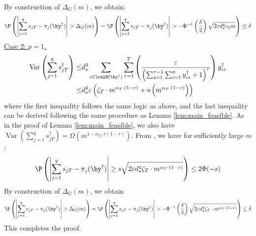 \documentclass[blindrev]{informs3noheader}
\DeclareMathOperator{\Var}{Var}
\begin{document}
By construction of $\Delta_G(m)$, we obtain:
\[\P\left(\left|\sum_{j=1}^q s_{jT} - \pi_{j}(\by^\dagger)\right|>\Delta_G(m)\right)=\P\left(\left|\sum_{j=1}^q s_{jT} - \pi_{j}(\by^\dagger)\right|> -\Phi^{-1}\left(\frac{\delta}{2}\right)\sqrt{2\varepsilon d_\star^4 c_0 m}\right)\leq\delta \]
\underline{Case 2: $p=1$.}
\begin{align*}
\Var\left(\sum_{j=1}^q s^\dagger_{jT}\right)
\leq & d_\star^3\sum_{i \in \calN(\by^\dagger)} \sum_{\tau=1}^T \left(\frac{\varepsilon}{\left(\sum_{s=1}^{\tau-1} \sum_{i=1}^n y^\dagger_{is} + 1\right)^r}\right)y^\dagger_{i\tau}
\\\leq & d_\star^4 \varepsilon\left(\zeta_T \cdot m^{\alpha_T \cdot (1-r)} + o\left(m^{\alpha_T \cdot (1-r)} \right)\right)
\end{align*}
where the first inequality follows the same logic as above, and the last inequality can be derived following the same procedure as Lemma \ref{lem:main_feasible}. As in the proof of Lemma \ref{lem:main_feasible}, we also have $\Var\left(\sum_{j=1}^q s^\dagger_{jT}\right)=\Omega(m^{1-\alpha_T\cdot r(1-r)})$. From \cite{janisch2024berry}, we have for sufficiently large $m$:
\[\P\left(\left|\sum_{j=1}^q s_{jT} - \pi_{j}(\by^\dagger)\right|\geq s\sqrt{2\varepsilon d_\star^4 \zeta_T \cdot m^{\alpha_T \cdot (1-r)} }\right)\leq2\Phi(-s) \]
By construction of $\Delta_G(m)$, we obtain
\[\P\left(\left|\sum_{j=1}^q s_{jT} - \pi_{j}(\by^\dagger)\right|> \Delta_G(m)\right)=\P\left(\left|\sum_{j=1}^q s_{jT} - \pi_{j}(\by^\dagger)\right|> -\Phi^{-1}\left(\frac{\delta}{2}\right)\sqrt{2\varepsilon d_\star^4 \zeta_T \cdot m^{\alpha_T \cdot (1-r)} }\right)\leq\delta \]
This completes the proof.
\hfill\Halmos
\end{document}
